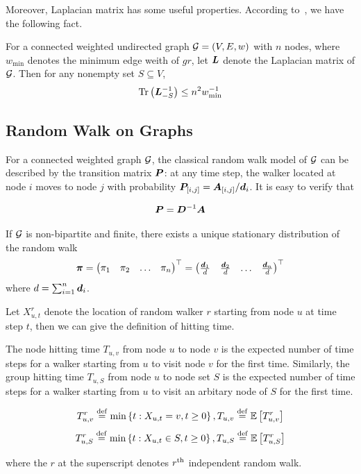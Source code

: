 \documentclass[sigconf]{acmart}
\begin{document}
Moreover, Laplacian matrix has some useful properties. According to~\cite{LiPeShYiZh19}, we have the following fact.
\begin{fact}\label{fact:trace-lap}
    For a connected weighted undirected graph \(\mathcal{G}=(V,E,w)\) with \(n\) nodes, where \(w_{\min}\) denotes the minimum edge weith of \(gr\), let \(\boldsymbol{L}\) denote the Laplacian matrix of \(\mathcal{G}\).
    Then for any nonempty set \(S\subseteq V\),
    \[\mathrm{Tr}\left(\boldsymbol{L}_{-S}^{-1}\right)\le n^2w_{\min}^{-1}\]
\end{fact}

\subsection{Random Walk on Graphs}

For a connected weighted graph \(\mathcal{G}\), the classical random walk model of \(\mathcal{G}\) can be described by the transition matrix \(\boldsymbol{P}\): at any time step, the walker located at node \(i\) moves to node \(j\) with probability \({\boldsymbol{P}_{[i,j]}=\boldsymbol{A}_{[i,j]}}/{\boldsymbol{d}}_i\).
It is easy to verify that

\begin{equation}\label{eq:trs}
    \boldsymbol{P}=\boldsymbol{D}^{-1}\boldsymbol{A}
\end{equation}

If \(\mathcal{G}\) is non-bipartite and finite, there exists a unique stationary distribution of the random walk
\[
    \boldsymbol{\pi}=\begin{pmatrix}
        \pi_1 & \pi_2 & \dots & \pi_n
    \end{pmatrix}^\top=\begin{pmatrix}
        \frac{\boldsymbol{d}_1}{d} & \frac{\boldsymbol{d}_2}{d} & \dots & \frac{\boldsymbol{d}_n}{d}
    \end{pmatrix}^\top
\]
where \(d=\sum_{i=1}^n\boldsymbol{d}_i\).

Let \(X_{u,t}^r\) denote the location of random walker \(r\) starting from node \(u\) at time step \(t\), then we can give the definition of hitting time.

The node hitting time \(T_{u,v}\) from node \(u\) to node \(v\) is the expected number of time steps for a walker starting from \(u\) to visit node \(v\) for the first time.
Similarly, the group hitting time \(T_{u,S}\) from node \(u\) to node set \(S\) is the expected number of time steps for a walker starting from \(u\) to visit an arbitary node of \(S\) for the first time.

\begin{definition}
    \[T_{u,v}^r\stackrel{\mathrm{def}}{=}\min\left\{t:X_{u,t}=v,t\ge0 \right\},T_{u,v}\stackrel{\mathrm{def}}{=}\mathbb{E}\left[T_{u,v}^r\right]\]
    \[T_{u,S}^r\stackrel{\mathrm{def}}{=}\min\left\{t:X_{u,t}\in S,t\ge0 \right\},T_{u,S}\stackrel{\mathrm{def}}{=}\mathbb{E}\left[T_{u,S}^r\right]\]
\end{definition}
where the \(r\) at the superscript denotes \({r}^{\rm{th}}\) independent random walk.
\end{document}
